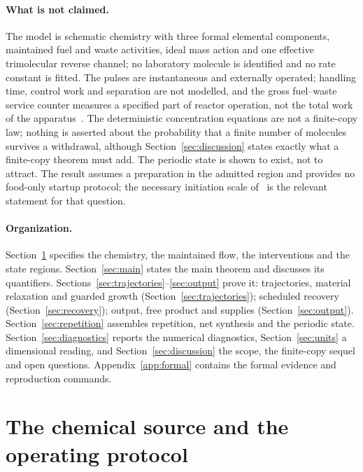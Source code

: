 \documentclass[11pt,a4paper]{article}
\theoremstyle{plain}
\theoremstyle{definition}
\theoremstyle{remark}
\begin{document}
\paragraph{What is not claimed.}
The model is schematic chemistry with three formal elemental components, maintained fuel and waste activities, ideal mass action and one effective trimolecular reverse channel; no laboratory molecule is identified and no rate constant is fitted. The pulses are instantaneous and externally operated; handling time, control work and separation are not modelled, and the gross fuel--waste service counter measures a specified part of reactor operation, not the total work of the apparatus~\citep{rao2016}. The deterministic concentration equations are not a finite-copy law; nothing is asserted about the probability that a finite number of molecules survives a withdrawal, although Section~\ref{sec:discussion} states exactly what a finite-copy theorem must add. The periodic state is shown to exist, not to attract. The result assumes a preparation in the admitted region and provides no food-only startup protocol; the necessary initiation scale of~\citep{thermo2026} is the relevant statement for that question.

\paragraph{Organization.}
Section~\ref{sec:model} specifies the chemistry, the maintained flow, the interventions and the state regions. Section~\ref{sec:main} states the main theorem and discusses its quantifiers. Sections~\ref{sec:trajectories}--\ref{sec:output} prove it: trajectories, material relaxation and guarded growth (Section~\ref{sec:trajectories}); scheduled recovery (Section~\ref{sec:recovery}); output, free product and supplies (Section~\ref{sec:output}). Section~\ref{sec:repetition} assembles repetition, net synthesis and the periodic state. Section~\ref{sec:diagnostics} reports the numerical diagnostics, Section~\ref{sec:units} a dimensional reading, and Section~\ref{sec:discussion} the scope, the finite-copy sequel and open questions. Appendix~\ref{app:formal} contains the formal evidence and reproduction commands.

\section{The chemical source and the operating protocol}\label{sec:model}
\end{document}

